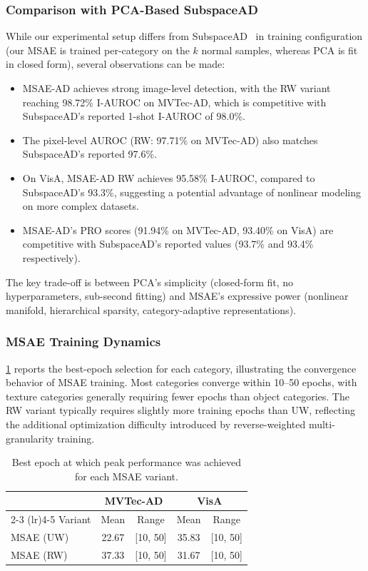 \subsubsection{Comparison with PCA-Based SubspaceAD}

While our experimental setup differs from SubspaceAD~\cite{Lendering2025SubspaceAD} in training configuration (our MSAE is trained per-category on the $k$ normal samples, whereas PCA is fit in closed form), several observations can be made:

\begin{itemize}
    \item MSAE-AD achieves strong image-level detection, with the RW variant reaching 98.72\% I-AUROC on MVTec-AD, which is competitive with SubspaceAD's reported 1-shot I-AUROC of 98.0\%.
    \item The pixel-level AUROC (RW: 97.71\% on MVTec-AD) also matches SubspaceAD's reported 97.6\%.
    \item On VisA, MSAE-AD RW achieves 95.58\% I-AUROC, compared to SubspaceAD's 93.3\%, suggesting a potential advantage of nonlinear modeling on more complex datasets.
    \item MSAE-AD's PRO scores (91.94\% on MVTec-AD, 93.40\% on VisA) are competitive with SubspaceAD's reported values (93.7\% and 93.4\% respectively).
\end{itemize}

The key trade-off is between PCA's simplicity (closed-form fit, no hyperparameters, sub-second fitting) and MSAE's expressive power (nonlinear manifold, hierarchical sparsity, category-adaptive representations).

\subsubsection{MSAE Training Dynamics}

\cref{tab:best_epochs} reports the best-epoch selection for each category, illustrating the convergence behavior of MSAE training.
Most categories converge within 10--50 epochs, with texture categories generally requiring fewer epochs than object categories.
The RW variant typically requires slightly more training epochs than UW, reflecting the additional optimization difficulty introduced by reverse-weighted multi-granularity training.

\begin{table}[t]
  \caption{Best epoch at which peak performance was achieved for each MSAE variant.}
  \label{tab:best_epochs}
  \centering
  \begin{tabular}{@{}lcc|cc@{}}
    \toprule
    & \multicolumn{2}{c|}{\textbf{MVTec-AD}} & \multicolumn{2}{c}{\textbf{VisA}} \\
    \cmidrule(lr){2-3} \cmidrule(lr){4-5}
    Variant & Mean & Range & Mean & Range \\
    \midrule
    MSAE (UW) & 22.67 & [10, 50] & 35.83 & [10, 50] \\
    MSAE (RW) & 37.33 & [10, 50] & 31.67 & [10, 50] \\
    \bottomrule
  \end{tabular}
\end{table}

